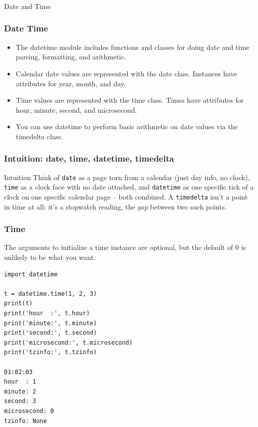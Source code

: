 \begin{frame}[fragile]\frametitle{}
\begin{center}
{\Large Date and Time}
\end{center}
\end{frame}


\begin{frame}[fragile]\frametitle{Date Time}

    \begin{itemize}
    \item  The datetime module includes functions and classes for doing date and time parsing, formatting, and arithmetic.
    \item Calendar date values are represented with the date class. Instances have attributes for year, month, and day. 
    \item Time values are represented with the time class. Times have attributes for hour, minute, second, and microsecond. 
    \item  You can use datetime to perform basic arithmetic on date values via the timedelta class.
    \end{itemize}
\end{frame}

\begin{frame}[fragile]\frametitle{Intuition: date, time, datetime, timedelta}
\begin{block}{Intuition}
Think of \texttt{date} as a page torn from a calendar (just day info, no clock), \texttt{time}
as a clock face with no date attached, and \texttt{datetime} as one specific tick of a clock on
one specific calendar page -- both combined. A \texttt{timedelta} isn't a point in time at all;
it's a stopwatch reading, the \emph{gap} between two such points.
\end{block}
\end{frame}

\begin{frame}[fragile]\frametitle{Time}
The arguments to initialize a time instance are optional, but the default of 0 is unlikely to be what you want.
\begin{lstlisting}
import datetime

t = datetime.time(1, 2, 3)
print(t)
print('hour  :', t.hour)
print('minute:', t.minute)
print('second:', t.second)
print('microsecond:', t.microsecond)
print('tzinfo:', t.tzinfo)

01:02:03
hour  : 1
minute: 2
second: 3
microsecond: 0
tzinfo: None
\end{lstlisting}

\end{frame}

